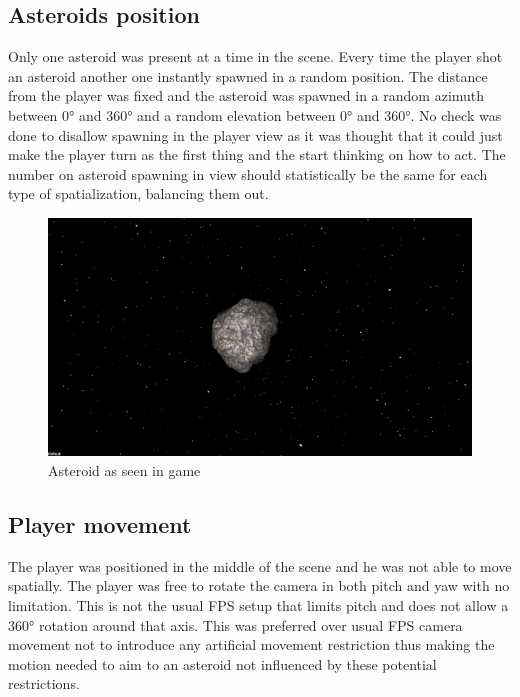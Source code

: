 \documentclass[conference]{IEEEtran}
\begin{document}
\subsection{Asteroids position}
Only one asteroid was present at a time in the scene.
Every time the player shot an asteroid another one instantly spawned in a random position.
The distance from the player was fixed and the asteroid was spawned in a random azimuth between 0° and 360° and a random elevation between 0° and 360°.
No check was done to disallow spawning in the player view as it was thought that it could just make the player turn as the first thing and the start thinking on how to act. The number on asteroid spawning in view should statistically be the same for each type of spatialization, balancing them out.
\begin{figure}[htbp]
\centerline{\includegraphics[scale=0.22]{gameplay.png}}
\caption{Asteroid as seen in game}
\label{fig2}
\end{figure}

\subsection{Player movement}
The player was positioned in the middle of the scene and he was not able to move spatially. The player was free to rotate the camera in both pitch and yaw with no limitation. This is not the usual FPS setup that limits pitch and does not allow a 360° rotation around that axis. This was preferred over usual FPS camera movement not to introduce any artificial movement restriction thus making the motion needed to aim to an asteroid not influenced by these potential restrictions.
\end{document}

